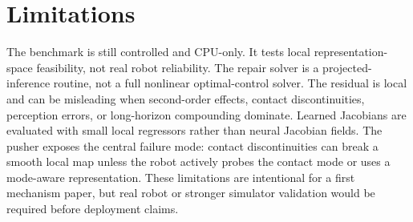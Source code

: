 \section{Limitations}

The benchmark is still controlled and CPU-only. It tests local representation-space feasibility, not real robot reliability. The repair solver is a projected-inference routine, not a full nonlinear optimal-control solver. The residual is local and can be misleading when second-order effects, contact discontinuities, perception errors, or long-horizon compounding dominate. Learned Jacobians are evaluated with small local regressors rather than neural Jacobian fields. The pusher exposes the central failure mode: contact discontinuities can break a smooth local map unless the robot actively probes the contact mode or uses a mode-aware representation. These limitations are intentional for a first mechanism paper, but real robot or stronger simulator validation would be required before deployment claims.
